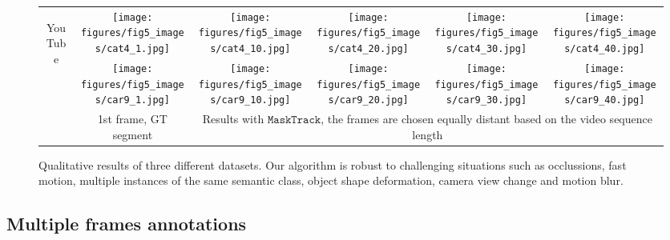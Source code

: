 \documentclass[10pt,twocolumn,letterpaper]{article}
\begin{document}
\begin{figure*}
\begin{centering}
\begin{tabular}{cccccc}
 \multirow{2}{*}{\begin{turn}{90}
{\footnotesize{}YouTube}
\end{turn}} &
\texttt{[image: figures/fig5\_images/cat4\_1.jpg]} &
\texttt{[image: figures/fig5\_images/cat4\_10.jpg]} &
\texttt{[image: figures/fig5\_images/cat4\_20.jpg]} &
\texttt{[image: figures/fig5\_images/cat4\_30.jpg]} &
\texttt{[image: figures/fig5\_images/cat4\_40.jpg]} \tabularnewline
   &
\texttt{[image: figures/fig5\_images/car9\_1.jpg]} &
\texttt{[image: figures/fig5\_images/car9\_10.jpg]} &
\texttt{[image: figures/fig5\_images/car9\_20.jpg]} &
\texttt{[image: figures/fig5\_images/car9\_30.jpg]} &
\texttt{[image: figures/fig5\_images/car9\_40.jpg]} \tabularnewline
&\footnotesize{}1st frame, GT segment & \multicolumn{4}{c}{\footnotesize{} Results with $\mathtt{MaskTrack}$, the frames are chosen equally distant based on the video sequence length}
\end{tabular}
\par\end{centering}
\caption{\label{fig:qualitative-results}
Qualitative results of three different datasets. Our algorithm is robust to challenging situations such as occlussions, fast motion, multiple instances of the same semantic class,
object shape deformation, camera view change and motion blur.}
\end{figure*}
 


\subsection{Multiple frames annotations}
\label{sec:few-frames-results}
\end{document}

